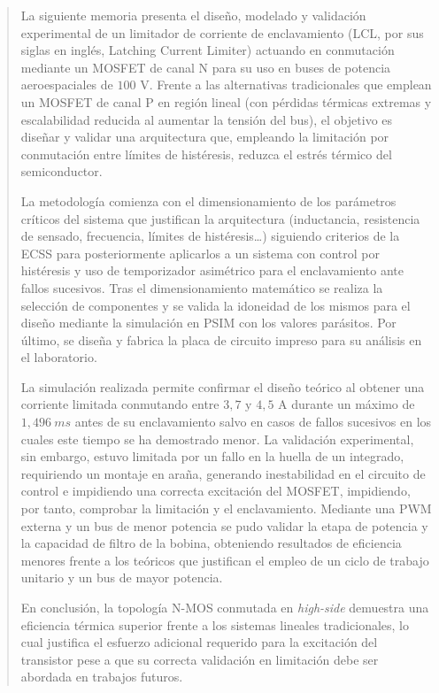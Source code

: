 \documentclass[12pt]{report} %
\begin{document}
\renewcommand\abstractname{\large\bfseries\filcenter\uppercase{Resumen}}
\begin{abstract}
\thispagestyle{plain}
\setcounter{page}{3}%
La siguiente memoria presenta el diseño, modelado y validación experimental de un limitador de corriente de enclavamiento (LCL, por sus siglas en inglés, Latching Current Limiter) actuando en conmutación mediante un MOSFET de canal N para su uso en buses de potencia aeroespaciales de $100\text{ V}$. Frente a las alternativas tradicionales que emplean un MOSFET de canal P en región lineal (con pérdidas térmicas extremas y escalabilidad reducida al aumentar la tensión del bus), el objetivo es diseñar y validar una arquitectura que, empleando la limitación por conmutación entre límites de histéresis, reduzca el estrés térmico del semiconductor. 

La metodología comienza con el dimensionamiento de los parámetros críticos del sistema que justifican la arquitectura (inductancia, resistencia de sensado, frecuencia, límites de histéresis\dots) siguiendo criterios de la ECSS para posteriormente aplicarlos a un sistema con control por histéresis y uso de temporizador asimétrico para el enclavamiento ante fallos sucesivos. Tras el dimensionamiento matemático se realiza la selección de componentes y se valida la idoneidad de los mismos para el diseño mediante la simulación en PSIM con los valores parásitos. Por último, se diseña y fabrica la placa de circuito impreso para su análisis en el laboratorio. 

La simulación realizada permite confirmar el diseño teórico al obtener una corriente limitada conmutando entre $3{,}7 \text{ y } 4{,}5\text{ A}$ durante un máximo de $1{,}496~ms$ antes de su enclavamiento salvo en casos de fallos sucesivos en los cuales este tiempo se ha demostrado menor. La validación experimental, sin embargo, estuvo limitada por un fallo en la huella de un integrado, requiriendo un montaje en araña, generando inestabilidad en el circuito de control e impidiendo una correcta excitación del MOSFET, impidiendo, por tanto, comprobar la limitación y el enclavamiento. Mediante una PWM externa y un bus de menor potencia se pudo validar la etapa de potencia y la capacidad de filtro de la bobina, obteniendo resultados de eficiencia menores frente a los teóricos que justifican el empleo de un ciclo de trabajo unitario y un bus de mayor potencia.  

En conclusión, la topología N-MOS conmutada en \textit{high-side} demuestra una eficiencia térmica superior frente a los sistemas lineales tradicionales, lo cual justifica el esfuerzo adicional requerido para la excitación del transistor pese a que su correcta validación en limitación debe ser abordada en trabajos futuros.


\end{abstract}
\end{document}
